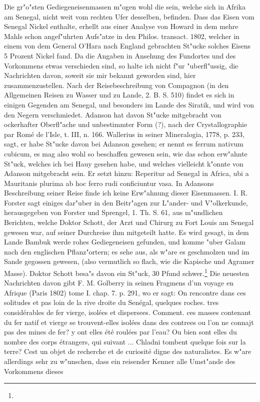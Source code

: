 \documentclass[a4paper, 11pt, oneside, polutonikogreek, german]{article}
\begin{document}
Die gr"o"sten Gediegeneisenmassen m"ogen wohl die sein, welche sich in Afrika am Senegal, nicht weit vom rechten Ufer desselben, befinden. Dass das Eisen vom Senegal Nickel enthalte, erhellt aus einer Analyse von Howard in dem mehre Mahls schon angef"uhrten Aufs"atze in den Philos. transact. 1802, welcher in einem von dem General O'Hara nach England gebrachten St"ucke solches Eisens 5 Prozent Nickel fand. Da die Angaben in Ansehung des Fundortes und des Vorkommens etwas verschieden sind, so halte ich nicht f"ur "uberfl"ussig, die Nachrichten davon, soweit sie mir bekannt geworden sind, hier zusammenzustellen. Nach der Reisebeschreibung von Compagnon (in den Allgemeinen Reisen zu Wasser und zu Lande, 2. B. S. 510) findet es sich in einigen Gegenden am Senegal, und besonders im Lande des Siratik, und wird von den Negern verschmiedet. Adanson hat davon St"ucke mitgebracht von ockerhafter Oberfl"ache und unbestimmter Form (?), nach der Crystallographie par Romé de l'Isle, t. III, n. 166. Wallerius in seiner Mineralogia, 1778, p. 233, sagt, er habe St"ucke davon bei Adanson gesehen; er nennt es ferrum nativum cubicum, es mag also wohl so beschaffen gewesen sein, wie das schon erw"ahnte St"uck, welches ich bei Hauy gesehen habe, und welches vielleicht k"onnte von Adanson mitgebracht sein. Er setzt hinzu: Reperitur ad Senegal in Africa, ubi a Mauritanis plurima ab hoc ferro rudi conficiuntur vasa. In Adansons Beschreibung seiner Reise finde ich keine Erw"ahnung dieser Eisenmassen. I. R. Forster sagt einiges dar"uber in den Beitr"agen zur L"ander- und V"olkerkunde, herausgegeben von Forster und Sprengel, 1. Th. S. 61, aus m"undlichen Berichten, welche Doktor Schott, der Arzt und Chirurg zu Fort Louis am Senegal gewesen war, auf seiner Durchreise ihm mitgeteilt hatte. Es wird gesagt, in dem Lande Bambuk werde rohes Gediegeneisen gefunden, und komme "uber Galam nach den englischen Pflanz"ortern; es sehe aus, als w"are es geschmolzen und im Sande gegossen gewesen, (also vermutlich so flach, wie die Kapische und Agramer Masse). Doktor Schott besa"s davon ein St"uck, 30 Pfund schwer.\footnote{} Die neuesten Nachrichten davon gibt F. M. Golberry in seinen Fragmens d'un voyage en Afrique (Paris 1802) tome I. chap. 7. p. 291, wo er sagt: On rencontre dans ces solitudes et pas loin de la rive droite du Senégal, quelques roches. tres considérables de fer vierge, isolées et dispersees. Comment. ces masses contenant du fer natif et vierge se trouvent-elles isolées dans des contrees ou l'on ne connajt pas des mines de fer? y ont elles été roulées par l'eau? Ou bien sont elles du nombre des corps étrangers, qui suivant ... Chladni tombent quelque fois sur la terre? Cest un objet de recherche et de curiosité digne des naturalistes. Es w"are allerdings sehr zu w"unschen, dass ein reisender Kenner alle Umst"ande des Vorkommens dieses 
\end{document}
